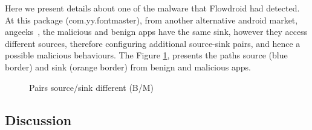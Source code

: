 Here we present details about one of the malware that Flowdroid had detected. At this package (com.yy.fontmaster), from another alternative android market, angeeks~\cite{angeeks}, the malicious and benign apps have the same sink, however they access different sources, therefore configuring additional source-sink pairs, and hence a possible malicious behaviours. The Figure \ref{fig:sourcesink}, presents the paths source (blue border) and sink (orange border) from benign and malicious apps.

\begin{figure}[ht]%
    \centering
    \qquad
    \caption{Pairs source/sink different (B/M)}%
    \label{fig:sourcesink}%
\end{figure}

\subsection{Discussion}\label{sec:discussion}

